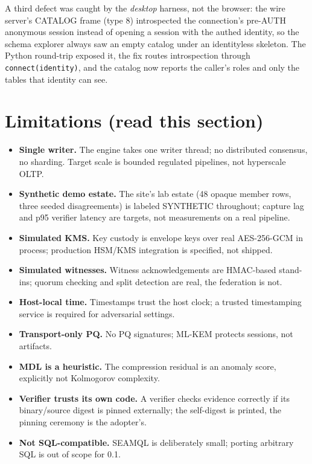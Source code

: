 \documentclass[11pt]{article}
\newcommand{\code}[1]{\texttt{#1}}
\begin{document}
A third defect was caught by the \emph{desktop} harness, not the browser:
the wire server's CATALOG frame (type 8) introspected the connection's
pre-AUTH anonymous session instead of opening a session with the authed
identity, so the schema explorer always saw an empty catalog under an
identityless skeleton. The Python round-trip exposed it, the fix routes
introspection through \code{connect(identity)}, and the catalog now reports
the caller's roles and only the tables that identity can see.

\section{Limitations (read this section)}
\label{sec:limitations}

\begin{itemize}
  \item \textbf{Single writer.} The engine takes one writer thread; no
    distributed consensus, no sharding. Target scale is bounded regulated
    pipelines, not hyperscale OLTP.
  \item \textbf{Synthetic demo estate.} The site's lab estate (48 opaque
    member rows, three seeded disagreements) is labeled SYNTHETIC
    throughout; capture lag and p95 verifier latency are targets, not
    measurements on a real pipeline.
  \item \textbf{Simulated KMS.} Key custody is envelope keys over real
    AES-256-GCM in process; production HSM/KMS integration is specified,
    not shipped.
  \item \textbf{Simulated witnesses.} Witness acknowledgements are
    HMAC-based stand-ins; quorum checking and split detection are real,
    the federation is not.
  \item \textbf{Host-local time.} Timestamps trust the host clock; a
    trusted timestamping service is required for adversarial settings.
  \item \textbf{Transport-only PQ.} No PQ signatures; ML-KEM protects
    sessions, not artifacts.
  \item \textbf{MDL is a heuristic.} The compression residual is an
    anomaly score, explicitly not Kolmogorov complexity.
  \item \textbf{Verifier trusts its own code.} A verifier checks evidence
    correctly if its binary/source digest is pinned externally; the
    self-digest is printed, the pinning ceremony is the adopter's.
  \item \textbf{Not SQL-compatible.} SEAMQL is deliberately small; porting
    arbitrary SQL is out of scope for 0.1.
\end{itemize}
\end{document}
